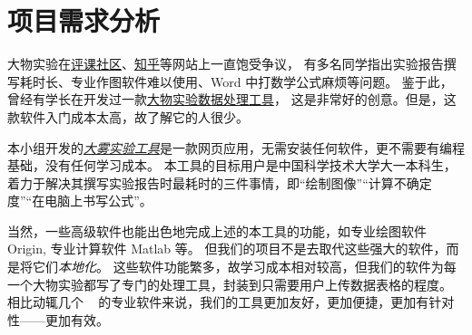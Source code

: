 \section{项目需求分析}

大物实验在\href{https://icourse.club/course/12716/}{评课社区}、\href{https://www.zhihu.com/question/35867101}{知乎}等网站上一直饱受争议，
有多名同学指出实验报告撰写耗时长、专业作图软件难以使用、Word 中打数学公式麻烦等问题。
鉴于此，曾经有学长在开发过一款\href{https://github.com/regymm/PhysicsExp}{大物实验数据处理工具}，
这是非常好的创意。但是，这款软件入门成本太高，故了解它的人很少。

本小组开发的\href{http://home.ustc.edu.cn/~sunxulei/dawu/}{\emph{大雾实验工具}}是一款网页应用，无需安装任何软件，更不需要有编程基础，没有任何学习成本。
本工具的目标用户是中国科学技术大学大一本科生，着力于解决其撰写实验报告时最耗时的三件事情，即“绘制图像”“计算不确定度”“在电脑上书写公式”。

当然，一些高级软件也能出色地完成上述的本工具的功能，如专业绘图软件 Origin, 专业计算软件 Matlab 等。
但我们的项目不是去取代这些强大的软件，而是将它们\emph{本地化}。
这些软件功能繁多，故学习成本相对较高，但我们的软件为每一个大物实验都写了专门的处理工具，封装到只需要用户上传数据表格的程度。
相比动辄几个 \unit{\giga\byte} 的专业软件来说，我们的工具更加友好，更加便捷，更加有针对性——更加有效。